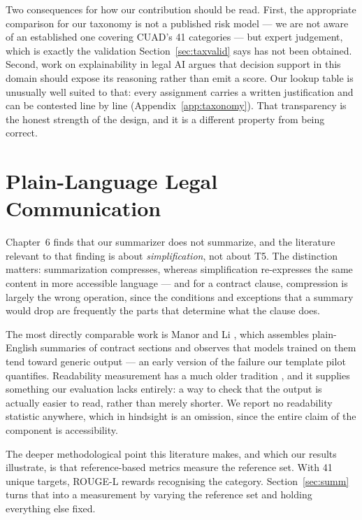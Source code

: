Two consequences for how our contribution should be read. First, the appropriate comparison for our taxonomy is not a published risk model --- we are not aware of an established one covering CUAD's 41 categories --- but expert judgement, which is exactly the validation Section~\ref{sec:taxvalid} says has not been obtained. Second, work on explainability in legal AI argues that decision support in this domain should expose its reasoning rather than emit a score. Our lookup table is unusually well suited to that: every assignment carries a written justification and can be contested line by line (Appendix~\ref{app:taxonomy}). That transparency is the honest strength of the design, and it is a different property from being correct.

\section{Plain-Language Legal Communication}
\label{sec:lit_plain}
Chapter~6 finds that our summarizer does not summarize, and the literature relevant to that finding is about \emph{simplification}, not about T5. The distinction matters: summarization compresses, whereas simplification re-expresses the same content in more accessible language --- and for a contract clause, compression is largely the wrong operation, since the conditions and exceptions that a summary would drop are frequently the parts that determine what the clause does.

The most directly comparable work is Manor and Li \cite{manor2019plain}, which assembles plain-English summaries of contract sections and observes that models trained on them tend toward generic output --- an early version of the failure our template pilot quantifies. Readability measurement has a much older tradition \cite{flesch1948}, and it supplies something our evaluation lacks entirely: a way to check that the output is actually easier to read, rather than merely shorter. We report no readability statistic anywhere, which in hindsight is an omission, since the entire claim of the component is accessibility.

The deeper methodological point this literature makes, and which our results illustrate, is that reference-based metrics measure the reference set. With 41 unique targets, ROUGE-L rewards recognising the category. Section~\ref{sec:summ} turns that into a measurement by varying the reference set and holding everything else fixed.

